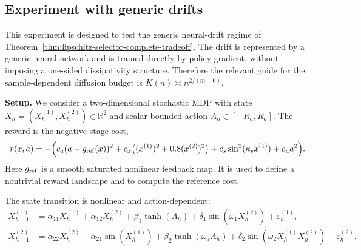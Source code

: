 \documentclass{article}
\newcommand{\1}{\mathbbm{1}}
\numberwithin{equation}{section}
\begin{document}

\subsection{Experiment with generic drifts}
This experiment is designed to test the generic neural-drift regime of Theorem~\ref{thm:lipschitz-selector-complete-tradeoff}. The drift is represented by a generic neural network and is trained directly by policy gradient, without imposing a one-sided dissipativity structure. Therefore the relevant guide for the sample-dependent diffusion budget is \(K(n)\asymp n^{2/(m+6)}\).


{\bf Setup.} We consider a two-dimensional stochastic MDP with state
\(X_h=(X_h^{(1)},X_h^{(2)})\in\mathbb R^2\) and scalar bounded action
\(A_h\in[-R_a,R_a]\). The reward is the negative stage cost,
\[
    r(x,a)
    = -\Big(
    c_a(a-g_{\rm ref}(x))^2
    +c_x\big((x^{(1)})^2+0.8(x^{(2)})^2\big)
    +c_s\sin^2(\kappa_s x^{(1)})
    +c_u a^2\Big).
\]
Here \(g_{\rm ref}\) is a smooth saturated nonlinear feedback map. It is used to
define a nontrivial reward landscape and to compute the reference cost.%

The state transition is nonlinear and action-dependent:
\[
\begin{aligned}
X_{h+1}^{(1)}
&=
\alpha_{11}X_h^{(1)}
+\alpha_{12}X_h^{(2)}
+\beta_1\tanh(A_h)
+\delta_1\sin(\omega_1X_h^{(2)})
+\varepsilon_h^{(1)},\\
X_{h+1}^{(2)}
&=
\alpha_{22}X_h^{(2)}
-\alpha_{21}\sin(X_h^{(1)})
+\beta_2\tanh(\omega_a A_h)
+\delta_2\sin(\omega_2X_h^{(1)}X_h^{(2)})
+\varepsilon_h^{(2)}.
\end{aligned}
\]
\end{document}
